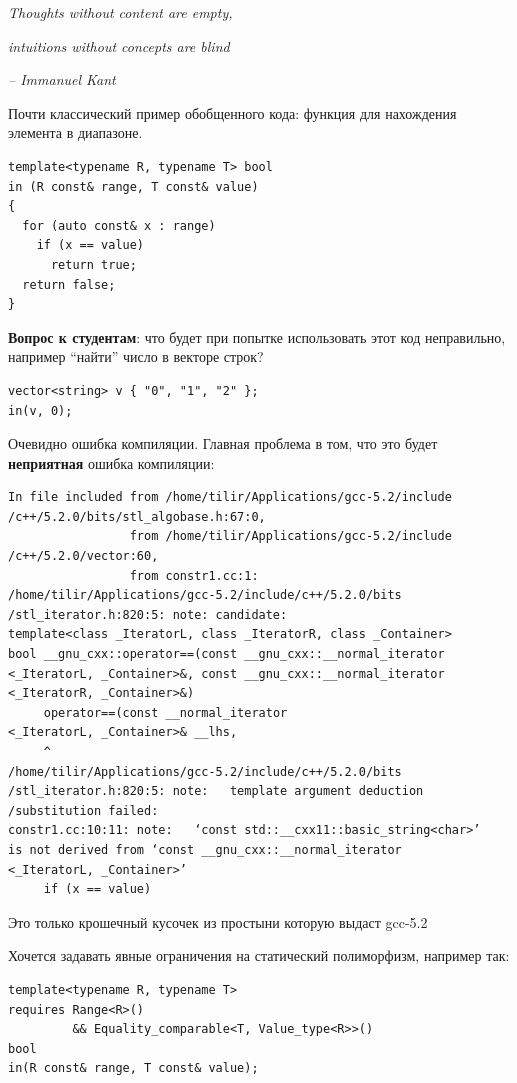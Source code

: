\documentclass[a4paper,12pt,oneside]{article}
\newif\ifanswers
\begin{document}
\hfill\textit{Thoughts without content are empty,}

\hfill\textit{intuitions without concepts are blind}{\vspace{0.5em}}

\hfill\textit{-- Immanuel Kant}

Почти классический пример обобщенного кода: функция для нахождения элемента в диапазоне.

\begin{lstlisting}
template<typename R, typename T> bool 
in (R const& range, T const& value) 
{
  for (auto const& x : range)
    if (x == value)
      return true;
  return false;
}
\end{lstlisting}

\textbf{Вопрос к студентам}: что будет при попытке использовать этот код неправильно, например ``найти'' число в векторе строк?

\begin{lstlisting}
vector<string> v { "0", "1", "2" };
in(v, 0);
\end{lstlisting}

Очевидно ошибка компиляции. Главная проблема в том, что это будет \textbf{неприятная} ошибка компиляции:

\begin{verbatim}
In file included from /home/tilir/Applications/gcc-5.2/include
/c++/5.2.0/bits/stl_algobase.h:67:0,
                 from /home/tilir/Applications/gcc-5.2/include
/c++/5.2.0/vector:60,
                 from constr1.cc:1:
/home/tilir/Applications/gcc-5.2/include/c++/5.2.0/bits
/stl_iterator.h:820:5: note: candidate: 
template<class _IteratorL, class _IteratorR, class _Container> 
bool __gnu_cxx::operator==(const __gnu_cxx::__normal_iterator
<_IteratorL, _Container>&, const __gnu_cxx::__normal_iterator
<_IteratorR, _Container>&)
     operator==(const __normal_iterator
<_IteratorL, _Container>& __lhs,
     ^
/home/tilir/Applications/gcc-5.2/include/c++/5.2.0/bits
/stl_iterator.h:820:5: note:   template argument deduction
/substitution failed:
constr1.cc:10:11: note:   ‘const std::__cxx11::basic_string<char>’ 
is not derived from ‘const __gnu_cxx::__normal_iterator
<_IteratorL, _Container>’
     if (x == value)
\end{verbatim}

Это только крошечный кусочек из простыни которую выдаст gcc-5.2

Хочется задавать явные ограничения на статический полиморфизм, например так:

\begin{lstlisting}
template<typename R, typename T>
requires Range<R>() 
         && Equality_comparable<T, Value_type<R>>()
bool 
in(R const& range, T const& value);
\end{lstlisting}
\end{document}
